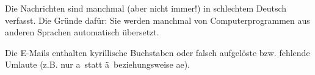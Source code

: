 \item Die Nachrichten sind manchmal (aber nicht immer!) in schlechtem Deutsch verfasst. Die Gründe dafür: Sie werden manchmal von Computerprogrammen aus anderen Sprachen automatisch übersetzt.
\item Die E-Mails enthalten kyrillische Buchstaben oder falsch aufgelöste bzw. fehlende Umlaute (z.B. nur \glqq a\grqq\ statt \glqq ä\grqq\ beziehungsweise \glqq ae\grqq).
